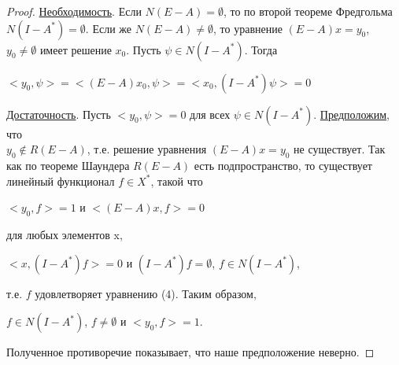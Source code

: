\documentclass[12pt,a4paper,titlepage, oneside]{book}
\theoremstyle{definition}
\theoremstyle{plain}
\theoremstyle{remark}
\theoremstyle{remark}
\theoremstyle{remark}
\theoremstyle{remark}
\theoremstyle{plain}
\theoremstyle{plain}
\begin{document}
\begin{proof}
\underline{Необходимость}. Если $N(E-A)=\emptyset$, то по второй теореме Фредгольма $N(I-A^*)=\emptyset$. Если же $N(E-A)\neq \emptyset$, то уравнение $(E-A)x=y_0$, $y_0 \neq \emptyset$ имеет решение $x_0$. Пусть $\psi \in N(I-A^*)$. Тогда
\begin{center}
$<y_0,\psi>=<(E-A)x_0,\psi>=<x_0,(I-A^*)\psi>=0$
\end{center}
\underline{Достаточность}. Пусть $<y_0,\psi>=0$ для всех $\psi \in N(I-A^*)$. \underline{Предположим}, что \\$y_0 \not \in R(E-A)$, т.е. решение уравнения $(E-A)x=y_0$ не существует. Так как по теореме Шаундера $R(E-A)$ есть подпространство, то существует линейный функционал $f\in X^*$, такой что 
\begin{center}
$<y_0,f>=1$ и $<(E-A)x,f>=0$
\end{center}
для любых элементов x,
\begin{center}
$<x,(I-A^*)f>=0$ и $(I-A^*)f=\emptyset$, $f \in N(I-A^*)$,
\end{center}
т.е. $f$ удовлетворяет уравнению (4). Таким образом,
\begin{center}
 $f \in N(I-A^*)$, $f\neq \emptyset$ и $<y_0,f>=1$.
\end{center}
Полученное противоречие показывает, что наше предположение неверно.
\end{proof}
\end{document}
